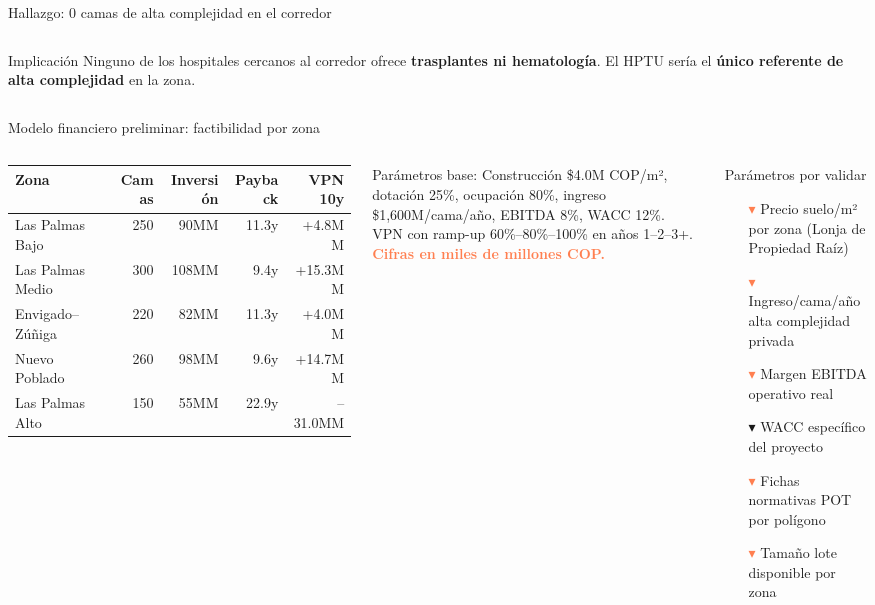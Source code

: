 \documentclass[aspectratio=169, 11pt]{beamer}
\begin{document}
{\begin{frame}{Hallazgo: 0 camas de alta complejidad en el corredor}
\begin{columns}[T]
\vspace{8pt}
\begin{exampleblock}{\small Implicación}
\small Ninguno de los hospitales cercanos al corredor ofrece \textbf{trasplantes ni hematología}. El HPTU sería el \textbf{único referente de alta complejidad} en la zona.
\end{exampleblock}
\end{columns}
\end{frame}
}

\begin{frame}{Modelo financiero preliminar: factibilidad por zona}

\begin{columns}[T]

{\footnotesize
\begin{tabular}{l r r r r}
\toprule
\textbf{Zona} & \textbf{Camas} & \textbf{Inversión} & \textbf{Payback} & \textbf{VPN 10y} \\
\midrule
\rowcolor{teal!10} Las Palmas Bajo & 250 & 90MM & 11.3y & +4.8MM \\
Las Palmas Medio & 300 & 108MM & 9.4y & +15.3MM \\
Envigado--Zúñiga & 220 & 82MM & 11.3y & +4.0MM \\
Nuevo Poblado & 260 & 98MM & 9.6y & +14.7MM \\
Las Palmas Alto & 150 & 55MM & 22.9y & --31.0MM \\
\bottomrule
\end{tabular}
}

\vspace{6pt}
{\tiny Parámetros base: Construcción \$4.0M COP/m², dotación 25\%, ocupación 80\%, ingreso \$1,600M/cama/año, EBITDA 8\%, WACC 12\%.\\
VPN con ramp-up 60\%--80\%--100\% en años 1--2--3+. \textcolor{coral}{\textbf{Cifras en miles de millones COP.}}}

\begin{alertblock}{\small Parámetros por validar}
\tiny
\begin{itemize}
  \item[\textcolor{coral}{$\blacktriangledown$}] Precio suelo/m² por zona (Lonja de Propiedad Raíz)
  \item[\textcolor{coral}{$\blacktriangledown$}] Ingreso/cama/año alta complejidad privada
  \item[\textcolor{coral}{$\blacktriangledown$}] Margen EBITDA operativo real
  \item[\textcolor{amber}{$\blacktriangledown$}] WACC específico del proyecto
  \item[\textcolor{coral}{$\blacktriangledown$}] Fichas normativas POT por polígono
  \item[\textcolor{coral}{$\blacktriangledown$}] Tamaño lote disponible por zona
\end{itemize}
\end{alertblock}


\end{columns}
\end{frame}
\end{document}
